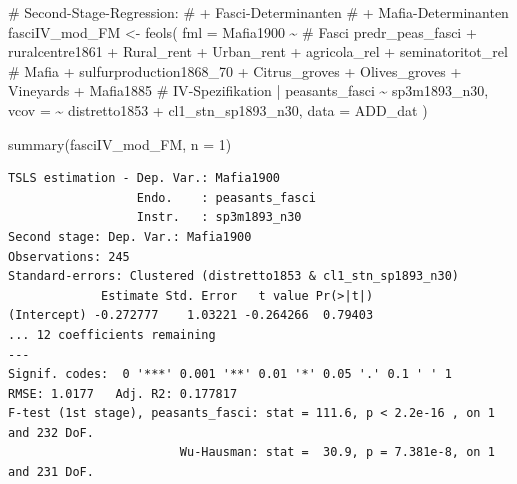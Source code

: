 \documentclass[
  a4paper,
  DIV=11,
  oneside]{scrreprt}
\newenvironment{Shaded}{\begin{snugshade}}{\end{snugshade}}
\newcommand{\AttributeTok}[1]{\textcolor[rgb]{0.40,0.45,0.13}{#1}}
\newcommand{\CommentTok}[1]{\textcolor[rgb]{0.37,0.37,0.37}{#1}}
\newcommand{\DecValTok}[1]{\textcolor[rgb]{0.68,0.00,0.00}{#1}}
\newcommand{\FunctionTok}[1]{\textcolor[rgb]{0.28,0.35,0.67}{#1}}
\newcommand{\NormalTok}[1]{\textcolor[rgb]{0.00,0.23,0.31}{#1}}
\newcommand{\OtherTok}[1]{\textcolor[rgb]{0.00,0.23,0.31}{#1}}
\newcommand{\SpecialCharTok}[1]{\textcolor[rgb]{0.37,0.37,0.37}{#1}}
\begin{document}
\begin{Shaded}
\begin{Highlighting}[]
\CommentTok{\# Second{-}Stage{-}Regression:}
\CommentTok{\# + Fasci{-}Determinanten}
\CommentTok{\# + Mafia{-}Determinanten}
\NormalTok{fasciIV\_mod\_FM }\OtherTok{\textless{}{-}} \FunctionTok{feols}\NormalTok{(}
  \AttributeTok{fml =}\NormalTok{ Mafia1900 }\SpecialCharTok{\textasciitilde{}} 
    \CommentTok{\# Fasci}
\NormalTok{    predr\_peas\_fasci}
  \SpecialCharTok{+}\NormalTok{ ruralcentre1861}
  \SpecialCharTok{+}\NormalTok{ Rural\_rent}
  \SpecialCharTok{+}\NormalTok{ Urban\_rent}
  \SpecialCharTok{+}\NormalTok{ agricola\_rel}
  \SpecialCharTok{+}\NormalTok{ seminatoritot\_rel}
    \CommentTok{\# Mafia}
  \SpecialCharTok{+}\NormalTok{ sulfurproduction1868\_70}
  \SpecialCharTok{+}\NormalTok{ Citrus\_groves}
  \SpecialCharTok{+}\NormalTok{ Olives\_groves}
  \SpecialCharTok{+}\NormalTok{ Vineyards}
  \SpecialCharTok{+}\NormalTok{ Mafia1885}
    \CommentTok{\# IV{-}Spezifikation}
  \SpecialCharTok{|}\NormalTok{ peasants\_fasci }\SpecialCharTok{\textasciitilde{}}\NormalTok{ sp3m1893\_n30,}
  \AttributeTok{vcov =} \SpecialCharTok{\textasciitilde{}}\NormalTok{ distretto1853 }\SpecialCharTok{+}\NormalTok{ cl1\_stn\_sp1893\_n30,}
  \AttributeTok{data =}\NormalTok{ ADD\_dat}
\NormalTok{) }

\FunctionTok{summary}\NormalTok{(fasciIV\_mod\_FM, }\AttributeTok{n =} \DecValTok{1}\NormalTok{)}
\end{Highlighting}
\end{Shaded}

\begin{verbatim}
TSLS estimation - Dep. Var.: Mafia1900
                  Endo.    : peasants_fasci
                  Instr.   : sp3m1893_n30
Second stage: Dep. Var.: Mafia1900
Observations: 245
Standard-errors: Clustered (distretto1853 & cl1_stn_sp1893_n30) 
             Estimate Std. Error   t value Pr(>|t|) 
(Intercept) -0.272777    1.03221 -0.264266  0.79403 
... 12 coefficients remaining
---
Signif. codes:  0 '***' 0.001 '**' 0.01 '*' 0.05 '.' 0.1 ' ' 1
RMSE: 1.0177   Adj. R2: 0.177817
F-test (1st stage), peasants_fasci: stat = 111.6, p < 2.2e-16 , on 1 and 232 DoF.
                        Wu-Hausman: stat =  30.9, p = 7.381e-8, on 1 and 231 DoF.
\end{verbatim}
\end{document}
